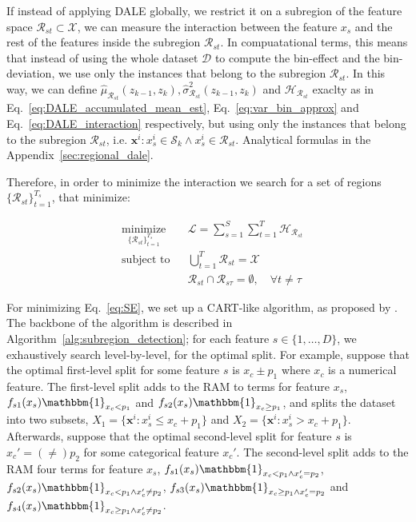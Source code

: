 \documentclass[12pt]{article}
\newcommand{\xb}{\mathbf{x}}
\newcommand{\when}[1]{\mathbbm{1}_{#1}}
\begin{document}
If instead of applying DALE globally, we restrict it on a subregion of the feature space
\(\mathcal{R}_{st} \subset \mathcal{X}\), we can measure the interaction between the feature \(x_s\) and the rest of the features
inside the subregion \(\mathcal{R}_{st}\).
In compuatational terms, this means that instead of using the whole dataset \(\mathcal{D}\) to compute the bin-effect and the bin-deviation,
we use only the instances that belong to the subregion \(\mathcal{R}_{st}\).
In this way, we can define $\hat{\mu}_{\mathcal{R}_{st}}(z_{k-1}, z_k), \hat{\sigma}_{\mathcal{R}_{st}}^2(z_{k-1}, z_k)$ and $\mathcal{H}_{\mathcal{R}_{st}}$ exaclty as in
Eq.~\eqref{eq:DALE_accumulated_mean_est}, Eq.~\eqref{eq:var_bin_approx} and Eq.~\eqref{eq:DALE_interaction} respectively,
but using only the instances that belong to the subregion \(\mathcal{R}_{st}\), i.e. $\xb^i: x_s^i \in \mathcal{S}_k \land x_{s}^i \in \mathcal{R}_{st}$.
Analytical formulas in the Appendix~\ref{sec:regional_dale}.

Therefore, in order to minimize the interaction we search for a set of regions \(\{\mathcal{R}_{st}\}_{t=1}^{T_s}\),
that minimize:

\begin{equation}
  \label{eq:optimal_subregions}
  \begin{aligned}
    & \underset{\{\mathcal{R}_{st}\}_{t=1}^{T_s}}{\text{minimize}}
    & & \mathcal{L} = \sum_{s=1}^S \sum_{t=1}^{T} \mathcal{H}_{\mathcal{R}_{st}} \\
    & \text{subject to}
    & & \bigcup_{t=1}^{T} \mathcal{R}_{st} = \mathcal{X} \\
    & & & \mathcal{R}_{st} \cap \mathcal{R}_{s\tau} = \emptyset, \quad \forall t \neq \tau
  \end{aligned}
\end{equation}

For minimizing Eq.~\eqref{eq:SE}, we set up a CART-like algorithm, as proposed by \citep{herbinger2023decomposing}.
The backbone of the algorithm is described in Algorithm~\ref{alg:subregion_detection};
for each feature $s \in \{1, \ldots, D\}$, we exhaustively search level-by-level, for the optimal split.
For example, suppose that the optimal first-level split for some feature $s$ is
$x_c \pm p_1$ where $x_c$ is a numerical feature.
The first-level split adds to the RAM to terms for feature $x_s$, $f_{s1}(x_s) \when{x_c < p_1}$ and $f_{s2}(x_s) \when{x_c \geq p_1}$,
and splits the dataset into two subsets, $X_1 = \{ \xb^i : x_s^i \leq x_c + p_1 \}$ and $X_2 = \{ \xb^i : x_s^i > x_c + p_1 \}$.
Afterwards, suppose that the optimal second-level split for feature $s$ is $x_c' = (\neq) p_2$ for some categorical feature $x_c'$.
The second-level split adds to the RAM four terms for feature $x_s$, $f_{s1}(x_s) \when{x_c < p_1 \land x_c' = p_2}$,
$f_{s2}(x_s) \when{x_c < p_1 \land x_c' \neq p_2}$, $f_{s3}(x_s) \when{x_c \geq p_1 \land x_c' = p_2}$ and $f_{s4}(x_s) \when{x_c \geq p_1 \land x_c' \neq p_2}$.
\end{document}

